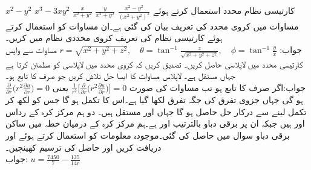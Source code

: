 \quad
$x^2-y^2$
\quad
$x^3-3xy^2$
\quad
$\tfrac{x}{x^2+y^2}$
\quad
$\tfrac{y}{x^2+y^2}$
\quad
$\tfrac{x^2-y^2}{(x^2+y^2)^2}$
\quad
کارتیسی نظام محدد استعمال کرتے ہوئے مساوات  میں کروی محدد کی تعریف بیان کی گئی ہے۔ان مساوات کو استعمال کرتے ہوئے کارتیسی نظام کی تعریف کروی محددی نظام میں کریں۔\\
جواب:\quad
$r=\sqrt{x^2+y^2+z^2},\quad \theta=\tan^{-1}\frac{z}{\sqrt{x^2+y^2+z^2}},\quad \phi=\tan^{-1}\frac{y}{x}$
\quad
مساوات  سے واپس کارتیسی محدد میں لاپلاسی حاصل کریں۔
\quad
تصدیق کریں کہ  کروی محدد میں لاپلاسی کو مطمئن کرتا ہے جہاں  مستقل ہے۔
\quad
لاپلاس مساوات  کا ایسا حل تلاش کریں جو صرف  کا تابع ہو۔\\
جواب:\quad اگر  صرف  کا تابع ہو تب مساوات   کی صورت 
$\tfrac{1}{r^2}\big[\tfrac{\partial}{\partial r}\big(r^2\tfrac{\partial u}{\partial r}\big)\big]=0$
 یعنی
$ \tfrac{\partial}{\partial r}\big(r^2\tfrac{\partial u}{\partial r}\big)=0$
ہو گی جہاں جزوی تفرق کی جگہ تفرق لکھا گیا ہے۔اس کا تکمل ہو گا جس کو  لکھ کر تکمل لینے سے درکار حل  حاصل ہو گا جہاں  اور  مستقل ہیں۔
\quad دو ہم مرکز کرہ کے رداس  اور  ہیں جبکہ ان پر برقی دباو بالترتیب  اور  ہے۔ہم مرکز کرہ کے درمیان خطہ میں ساکن برقی دباو  سوال  میں حاصل کی گئی۔موجودہ معلومات کو استعمال کرتے ہوئے  اور  دریافت کریں اور حاصل  کی ترسیم کھینچیں۔\\
جواب:\quad
$u=\tfrac{7450}{7}-\tfrac{135}{14 r}$
\quad
